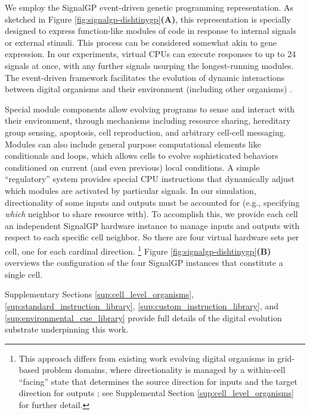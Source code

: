 We employ the SignalGP event-driven genetic programming representation.
As sketched in Figure \ref{fig:signalgp-dishtinygp}\textbf{(A)}, this representation is specially designed to express function-like modules of code in response to internal signals or external stimuli.
This process can be considered somewhat akin to gene expression.
In our experiments, virtual CPUs can execute responses to up to 24 signals at once, with any further signals usurping the longest-running modules.
The event-driven framework facilitates the evolution of dynamic interactions between digital organisms and their environment (including other organisms) \citep{lalejini2018evolving}.

Special module components allow evolving programs to sense and interact with their environment, through mechanisms including resource sharing, hereditary group sensing, apoptosis, cell reproduction, and arbitrary cell-cell messaging.
Modules can also include general purpose computational elements like conditionals and loops, which allows cells to evolve sophisticated behaviors conditioned on current (and even previous) local conditions.
A simple ``regulatory'' system provides special CPU instructions that dynamically adjust which modules are activated by particular signals.
In our simulation, directionality of some inputs and outputs must be accounted for (e.g., specifying \textit{which} neighbor to share resource with).
To accomplish this, we provide each cell an independent SignalGP hardware instance to manage inputs and outputs with respect to each specific cell neighbor.
So there are four virtual hardware sets per cell, one for each cardinal direction.%
\footnote{%
This approach differs from existing work evolving digital organisms in grid-based problem domains, where directionality is managed by a within-cell ``facing'' state that determines the source direction for inputs and the target direction for outputs \citep{goldsby2014evolutionary, goldsby2018serendipitous, grabowski2010early, biswas2014causes, lalejini2018evolving}; see Supplemental Section \ref{sup:cell_level_organisms} for further detail.
}
Figure \ref{fig:signalgp-dishtinygp}\textbf{(B)} overviews the configuration of the four SignalGP instances that constitute a single cell.

Supplementary Sections \ref{sup:cell_level_organisms}, \ref{sup:standard_instruction_library}, \ref{sup:custom_instruction_library}, and \ref{sup:environmental_cue_library} provide full details of the digital evolution substrate underpinning this work.

